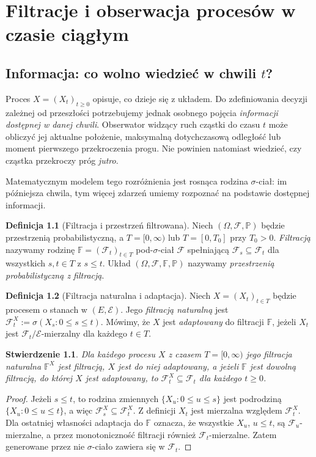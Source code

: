 \documentclass[11pt,a4paper,oneside]{report}
\numberwithin{equation}{chapter}
\theoremstyle{plain}
\newtheorem{stwierdzenie}[twierdzenie]{Stwierdzenie}
\theoremstyle{definition}
\newtheorem{definicja}{Definicja}[chapter]
\theoremstyle{remark}
\newcommand{\Prob}{\mathbb{P}}
\newcommand{\calF}{\mathcal{F}}
\newcommand{\calE}{\mathcal{E}}
\begin{document}
\chapter{Filtracje i obserwacja procesów w czasie ciągłym}
\label{ch:filtracje}

\section{Informacja: co wolno wiedzieć w chwili \texorpdfstring{$t$}{t}?}
Proces $X=(X_t)_{t\ge0}$ opisuje, co dzieje się z układem.
Do zdefiniowania decyzji zależnej od przeszłości potrzebujemy jednak
osobnego pojęcia \emph{informacji dostępnej w danej chwili}.
Obserwator widzący ruch cząstki do czasu $t$ może obliczyć jej
aktualne położenie, maksymalną dotychczasową odległość lub moment
pierwszego przekroczenia progu. Nie powinien natomiast wiedzieć,
czy cząstka przekroczy próg \emph{jutro}.

Matematycznym modelem tego rozróżnienia jest rosnąca rodzina
$\sigma$-ciał: im późniejsza chwila, tym więcej zdarzeń umiemy
rozpoznać na podstawie dostępnej informacji.

\begin{definicja}[Filtracja i przestrzeń filtrowana]
Niech $(\Omega,\calF,\Prob)$ będzie przestrzenią
probabilistyczną, a $T=[0,\infty)$ lub $T=[0,T_0]$
przy $T_0>0$. \emph{Filtracją} nazywamy rodzinę
$\mathbb F=(\calF_t)_{t\in T}$ pod-$\sigma$-ciał $\calF$
spełniającą $\calF_s\subseteq\calF_t$ dla wszystkich
$s,t\in T$ z $s\le t$. Układ
$(\Omega,\calF,\mathbb F,\Prob)$ nazywamy
\emph{przestrzenią probabilistyczną z filtracją}.
\end{definicja}

\begin{definicja}[Filtracja naturalna i adaptacja]
Niech $X=(X_t)_{t\in T}$ będzie procesem o stanach w
$(E,\calE)$. Jego \emph{filtracją naturalną} jest
$\calF_t^X:=\sigma(X_s:0\le s\le t)$.
Mówimy, że $X$ jest \emph{adaptowany} do filtracji
$\mathbb F$, jeżeli $X_t$ jest $\calF_t/\calE$-mierzalny
dla każdego $t\in T$.
\end{definicja}

\begin{stwierdzenie}
Dla każdego procesu $X$ z czasem $T=[0,\infty)$
jego filtracja naturalna $\mathbb F^X$ jest filtracją,
$X$ jest do niej adaptowany, a jeżeli $\mathbb F$
jest dowolną filtracją, do której $X$ jest adaptowany,
to $\calF_t^X\subseteq\calF_t$ dla każdego $t\ge0$.
\end{stwierdzenie}
\begin{proof}
Jeżeli $s\le t$, to rodzina zmiennych
$\{X_u:0\le u\le s\}$ jest podrodziną
$\{X_u:0\le u\le t\}$, a więc
$\calF_s^X\subseteq\calF_t^X$.
Z definicji $X_t$ jest mierzalna względem
$\calF_t^X$. Dla ostatniej własności
adaptacja do $\mathbb F$ oznacza, że wszystkie
$X_u$, $u\le t$, są $\calF_u$-mierzalne,
a przez monotoniczność filtracji również
$\calF_t$-mierzalne. Zatem generowane przez nie
$\sigma$-ciało zawiera się w $\calF_t$.
\end{proof}
\end{document}
